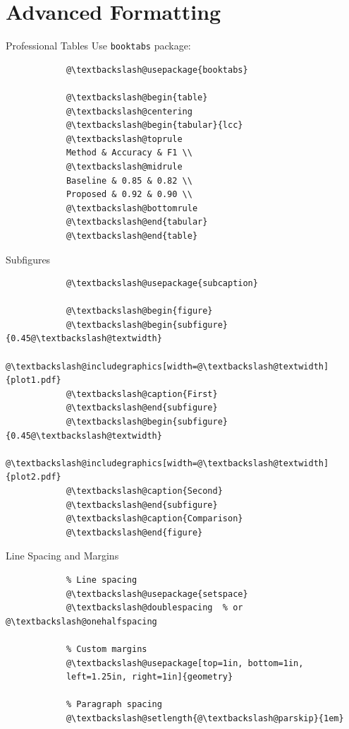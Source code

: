 \documentclass[aspectratio=169]{beamer}
\begin{document}
	\section{Advanced Formatting}
	
	\begin{frame}[fragile]{Professional Tables}
		Use \texttt{booktabs} package:
		
		\begin{lstlisting}
			@\textbackslash@usepackage{booktabs}
			
			@\textbackslash@begin{table}
			@\textbackslash@centering
			@\textbackslash@begin{tabular}{lcc}
			@\textbackslash@toprule
			Method & Accuracy & F1 \\
			@\textbackslash@midrule
			Baseline & 0.85 & 0.82 \\
			Proposed & 0.92 & 0.90 \\
			@\textbackslash@bottomrule
			@\textbackslash@end{tabular}
			@\textbackslash@end{table}
		\end{lstlisting}
	\end{frame}
	
	\begin{frame}[fragile]{Subfigures}
		\begin{lstlisting}
			@\textbackslash@usepackage{subcaption}
			
			@\textbackslash@begin{figure}
			@\textbackslash@begin{subfigure}{0.45@\textbackslash@textwidth}
			@\textbackslash@includegraphics[width=@\textbackslash@textwidth]{plot1.pdf}
			@\textbackslash@caption{First}
			@\textbackslash@end{subfigure}
			@\textbackslash@begin{subfigure}{0.45@\textbackslash@textwidth}
			@\textbackslash@includegraphics[width=@\textbackslash@textwidth]{plot2.pdf}
			@\textbackslash@caption{Second}
			@\textbackslash@end{subfigure}
			@\textbackslash@caption{Comparison}
			@\textbackslash@end{figure}
		\end{lstlisting}
	\end{frame}
	
	\begin{frame}[fragile]{Line Spacing and Margins}
		\begin{lstlisting}
			% Line spacing
			@\textbackslash@usepackage{setspace}
			@\textbackslash@doublespacing  % or @\textbackslash@onehalfspacing
			
			% Custom margins
			@\textbackslash@usepackage[top=1in, bottom=1in,
			left=1.25in, right=1in]{geometry}
			
			% Paragraph spacing
			@\textbackslash@setlength{@\textbackslash@parskip}{1em}
		\end{lstlisting}
	\end{frame}
	
\end{document}
